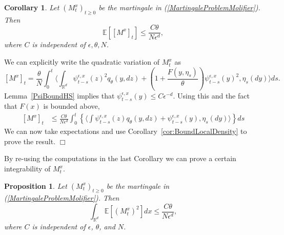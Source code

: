 \documentclass[12pt]{article}
\newenvironment {proof}{{\noindent\bf Proof }}{\hfill $\Box$ \medskip}
\newtheorem{proposition}[theorem]{Proposition}
\newtheorem{corollary}[theorem]{Corollary}
\newcommand{\IE}{\mathbb E}
\newcommand{\IR}{\mathbb R}
\begin{document}
\begin{corollary}
    Let $(M_t^x)_{t \geq 0}$ be the martingale in (\ref{MartingaleProblemMolifier}).
    Then
    \[
        \IE\left[ [M^x]_t \right] \leq \frac{C \theta}{ N \epsilon^{d}} ,
    \]
    where $C$ is independent of $\epsilon,\theta,N$. \label{Cor:ControlQVMQ}
\end{corollary}

\begin{proof}
    We can explicitly write the quadratic variation of $M^x_t$ as
    \[
        [M^x]_t
        =
        \frac{\theta}{N} \int_0^t \langle
            \int_{\IR^d} \psi_{t-s}^{\epsilon,x}(z)^2 q_\theta(y,dz)
            +
            \left(1 + \frac{F(y, \eta_s)}{\theta}\right) \psi_{t-s}^{\epsilon,x}(y)^2,
        \eta_s(dy) \rangle  ds .
    \]
    Lemma~\ref{PsiBoundHS} implies that $\psi_{t-s}^{\epsilon,x}(y) \le C \epsilon^{-d}$.
    Using this and the fact that $F(x)$ is bounded above,
    \begin{align} \label{QuadVarBound}
    [M^x]_t
        &\leq
        \frac{C \theta}{N \epsilon^d} \int_0^t \left\{
            \langle \int \psi_{t-s}^{\epsilon,x}(z) q_\theta(y,dz)
            +
            \psi_{t-s}^{\epsilon,x}(y)
            , \eta_s(dy)\rangle
        \right\} ds 
    \end{align}
    We can now take expectations and use Corollary~\ref{cor:BoundLocalDensity} to prove the result.
\end{proof}

By re-using the computations in the last Corollary we can prove a certain integrability of $M_t^x$.

\begin{proposition}  \label{IntegrabilityOfM}
    Let $(M_t^x)_{t \geq 0}$ be the martingale in (\ref{MartingaleProblemMolifier}).
    Then
    \[
        \int_{\IR^d} \IE\left[ (M_t^x)^2 \right] dx \leq \frac{C \theta}{ N \epsilon^{d}} ,
    \]
    where $C$ is independent of $\epsilon$, $\theta$, and $N$.
\end{proposition}
\end{document}
